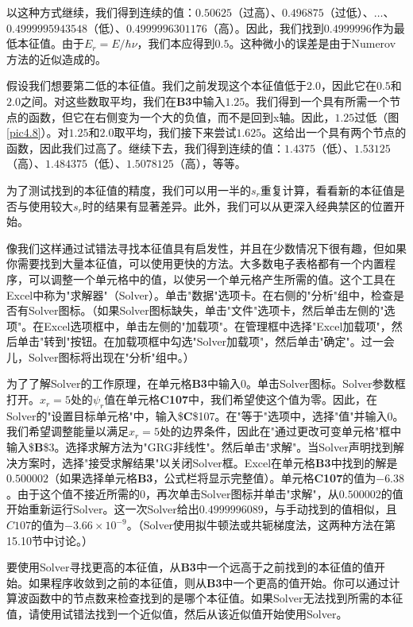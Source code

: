 \documentclass[12pt,a4paper,openany]{ctexbook}
\begin{document}
\begin{flushleft}
以这种方式继续，我们得到连续的值：\(0.50625\)（过高）、\(0.496875\)（过低）、\(\dots\)、\(0.4999995943548\)（低）、\(0.4999996301176\)（高）。因此，我们找到\(0.4999996\)作为最低本征值。由于\(E_r = E/\hbar\nu\)，我们本应得到\(0.5\)。这种微小的误差是由于Numerov方法的近似造成的。

假设我们想要第二低的本征值。我们之前发现这个本征值低于\(2.0\)，因此它在\(0.5\)和\(2.0\)之间。对这些数取平均，我们在\textbf{B3}中输入\(1.25\)。我们得到一个具有所需一个节点的函数，但它在右侧变为一个大的负值，而不是回到x轴。因此，\(1.25\)过低（图\ref{pic4.8}）。对\(1.25\)和\(2.0\)取平均，我们接下来尝试\(1.625\)。这给出一个具有两个节点的函数，因此我们过高了。继续下去，我们得到连续的值：\(1.4375\)（低）、\(1.53125\)（高）、\(1.484375\)（低）、\(1.5078125\)（高），等等。

为了测试找到的本征值的精度，我们可以用一半的\(s_r\)重复计算，看看新的本征值是否与使用较大\(s_r\)时的结果有显著差异。此外，我们可以从更深入经典禁区的位置开始。

像我们这样通过试错法寻找本征值具有启发性，并且在少数情况下很有趣，但如果你需要找到大量本征值，可以使用更快的方法。大多数电子表格都有一个内置程序，可以调整一个单元格中的值，以使另一个单元格产生所需的值。这个工具在Excel中称为"求解器"（Solver）。单击"数据"选项卡。在右侧的"分析"组中，检查是否有Solver图标。（如果Solver图标缺失，单击"文件"选项卡，然后单击左侧的"选项"。在Excel选项框中，单击左侧的"加载项"。在管理框中选择"Excel加载项"，然后单击"转到"按钮。在加载项框中勾选"Solver加载项"，然后单击"确定"。过一会儿，Solver图标将出现在"分析"组中。）

为了了解Solver的工作原理，在单元格\textbf{B3}中输入\(0\)。单击Solver图标。Solver参数框打开。\(x_r = 5\)处的\(\psi_r\)值在单元格\textbf{C107}中，我们希望使这个值为零。因此，在Solver的"设置目标单元格"中，输入\$\textbf{C}\$107。在"等于"选项中，选择"值"并输入\(0\)。我们希望调整能量以满足\(x_r = 5\)处的边界条件，因此在"通过更改可变单元格"框中输入\$\textbf{B}\$3。选择求解方法为"GRG非线性"。然后单击"求解"。当Solver声明找到解决方案时，选择"接受求解结果"以关闭Solver框。Excel在单元格\textbf{B3}中找到的解是\(0.500002\)（如果选择单元格\textbf{B3}，公式栏将显示完整值）。单元格\textbf{C107}的值为\(-6.38\)。由于这个值不接近所需的\(0\)，再次单击Solver图标并单击"求解"，从\(0.500002\)的值开始重新运行Solver。这一次Solver给出\(0.4999996089\)，与手动找到的值相似，且\(C107\)的值为\(-3.66 \times 10^{-9}\)。（Solver使用拟牛顿法或共轭梯度法，这两种方法在第15.10节中讨论。）

要使用Solver寻找更高的本征值，从\textbf{B3}中一个远高于之前找到的本征值的值开始。如果程序收敛到之前的本征值，则从\textbf{B3}中一个更高的值开始。你可以通过计算波函数中的节点数来检查找到的是哪个本征值。如果Solver无法找到所需的本征值，请使用试错法找到一个近似值，然后从该近似值开始使用Solver。


\end{flushleft}
\end{document}
